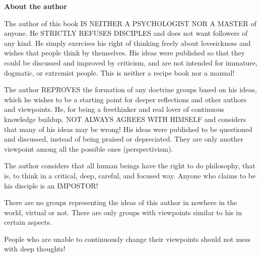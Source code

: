 \centering \large{\textbf{About the author}}

\justifying \normalsize

\par The author of this book IS NEITHER A PSYCHOLOGIST NOR A MASTER of anyone. He STRICTLY REFUSES DISCIPLES and does not want followers of any kind. He simply exercises his right of thinking freely about lovesickness and wishes that people think by themselves. His ideas were published so that they could be discussed and improved by criticism, and are not intended for immature, dogmatic, or extremist people. This is neither a recipe book nor a manual!

\par The author REPROVES the formation of any doctrine groups based on his ideas, which he wishes to be a starting point for deeper reflections and other authors and viewpoints. He, for being a freethinker and real lover of continuous knowledge buildup, NOT ALWAYS AGREES WITH HIMSELF and considers that many of his ideas may be wrong! His ideas were published to be questioned and discussed, instead of being praised or depreciated. They are only another viewpoint among all the possible ones (perspectivism).

\par The author considers that all human beings have the right to do philosophy, that is, to think in a critical, deep, careful, and focused way. Anyone who claims to be his disciple is an IMPOSTOR!

\par There are no groups representing the ideas of this author in nowhere in the world, virtual or not. There are only groups with viewpoints similar to his in certain aspects.

\par People who are unable to continuously change their viewpoints should not mess with deep thoughts!